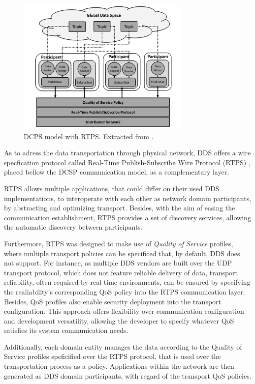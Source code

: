 \begin{figure}[H]
    \centering
    \includegraphics[width=0.5\linewidth]{images/dcps-model.png}
    \caption{DCPS model with RTPS. Extracted from \cite{maruyama2016exploring}.}
    \label{fig:dcps-model}
\end{figure}

As to adress the data transportation through physical network, DDS offers a wire specfication protocol called Real-Time Publish-Subscribe Wire Protocol (RTPS) \cite{rtps}, placed bellow the DCSP communication model, as a complementary layer. \cite{yun2017data} 

RTPS allows multiple applications, that could differ on their used DDS implementations, to interoperate with each other as network domain participants, by abstracting and optimizing transport. Besides, with the aim of easing the communication establishment, RTPS provides a set of discovery services, allowing the automatic discovery between participants.

Furthermore, RTPS was designed to make use of \textit{Quality of Service} profiles, where multiple transport policies can be specificed that, by default, DDS does not support. For instance, as multiple DDS vendors are built over the UDP \cite{udp} transport protocol, which does not feature reliable delivery of data, transport reliability, often required by real-time environments, can be ensured by specifying the realiability's corresponding QoS policy into the RTPS communication layer. Besides, QoS profiles also enable security deployment into the transport configuration. This approach offers flexibility over communication configuration and development versatility, allowing the developer to specify whatever QoS satisfies its system communication needs.

Additionally, each domain entity manages the data according to the Quality of Service profiles speficified over the RTPS protocol, that is used over the transportation process as a policy. Applications within the network are then generated as DDS domain participants, with regard of the transport QoS policies. 

